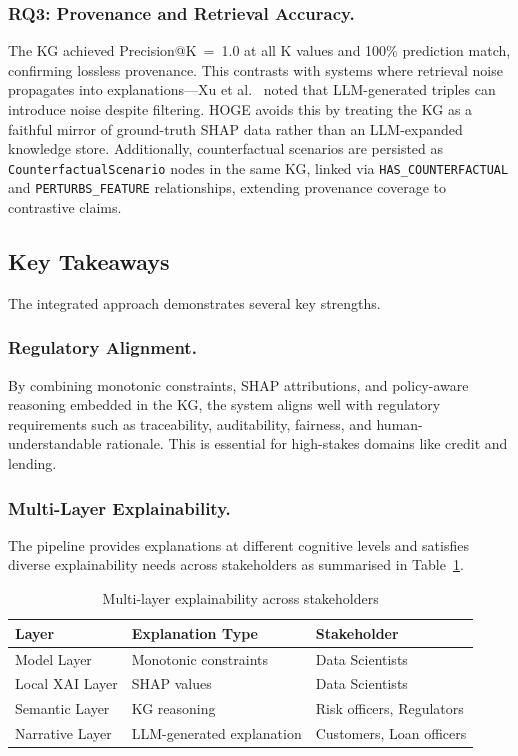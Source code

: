 \documentclass[lnbip]{svmultln}
\begin{document}
\subsubsection{RQ3: Provenance and Retrieval Accuracy.}
The KG achieved Precision@K~=~1.0 at all K values and 100\% prediction match, confirming lossless provenance. This contrasts with systems where retrieval noise propagates into explanations---Xu et al.~\cite{synkg2025} noted that LLM-generated triples can introduce noise despite filtering. HOGE avoids this by treating the KG as a faithful mirror of ground-truth SHAP data rather than an LLM-expanded knowledge store. Additionally, counterfactual scenarios are persisted as \texttt{CounterfactualScenario} nodes in the same KG, linked via \texttt{HAS\_COUNTERFACTUAL} and \texttt{PERTURBS\_FEATURE} relationships, extending provenance coverage to contrastive claims.

\subsection{Key Takeaways}
The integrated approach demonstrates several key strengths.

\subsubsection{Regulatory Alignment.}
By combining monotonic constraints, SHAP attributions, and policy-aware reasoning embedded in the KG, the system aligns well with regulatory requirements such as traceability, auditability, fairness, and human-understandable rationale. This is essential for high-stakes domains like credit and lending.

\subsubsection{Multi-Layer Explainability.}
The pipeline provides explanations at different cognitive levels and satisfies diverse explainability needs across stakeholders as summarised in Table~\ref{tab:layers}.

\begin{table}[h]
    \centering
    \caption{Multi-layer explainability across stakeholders}
    \label{tab:layers}
    \begin{tabular}{l l l}
        \toprule
        \textbf{Layer} & \textbf{Explanation Type} & \textbf{Stakeholder} \\
        \midrule
        Model Layer & Monotonic constraints & Data Scientists \\
        Local XAI Layer & SHAP values & Data Scientists \\
        Semantic Layer & KG reasoning & Risk officers, Regulators \\
        Narrative Layer & LLM-generated explanation & Customers, Loan officers \\
        \bottomrule
    \end{tabular}
\end{table}
\end{document}
